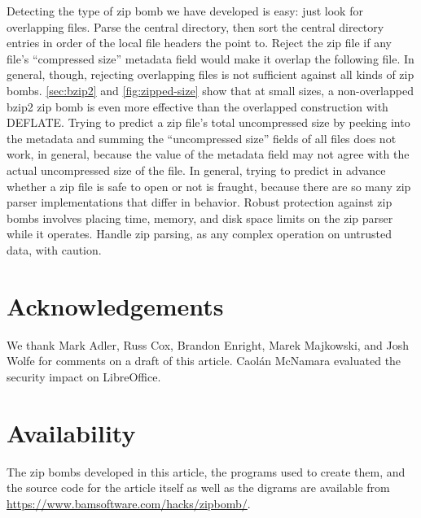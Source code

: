 \documentclass[letterpaper,twocolumn,10pt]{article}
\begin{document}
Detecting the type of zip bomb we have developed is easy:
just look for overlapping files.
Parse the central directory,
then sort the central directory entries
in order of the local file headers the point to.
Reject the zip file if any file's ``compressed size''
metadata field would make it overlap the following file.
In general, though, rejecting overlapping files is not sufficient against all kinds of zip bombs.
\autoref{sec:bzip2} and \autoref{fig:zipped-size}
show that at small sizes, a non-overlapped bzip2 zip bomb
is even more effective than
the overlapped construction with DEFLATE.
Trying to predict a zip file's total uncompressed size
by peeking into the metadata and summing
the ``uncompressed size'' fields of all files
does not work, in general,
because the value of the metadata field
may not agree with the actual uncompressed size of the file.
In general, trying to predict in advance whether a zip file
is safe to open or not is fraught,
because there are so many zip parser implementations
that differ in behavior.
Robust protection against zip bombs
involves placing time, memory, and disk space limits
on the zip parser while it operates.
Handle zip parsing,
as any complex operation on untrusted data,
with caution.


\section*{Acknowledgements}

We thank
Mark Adler,
Russ Cox,
Brandon Enright,
Marek Majkowski,
and Josh Wolfe
for comments on a draft of this article.
Caolán McNamara evaluated the security impact
on LibreOffice.


\section*{Availability}

The zip bombs developed in this article,
the programs used to create them,
and the source code for the article itself
as well as the digrams
are available from
\url{https://www.bamsoftware.com/hacks/zipbomb/}.




\end{document}
